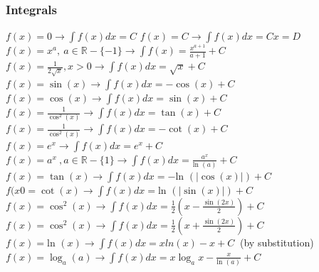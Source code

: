 \documentclass[12pt]{article}
\def\ln{\text{ln\ }} %
\begin{document}
\begin{flushleft}
	\subsubsection{Integrals}
	
	\textbullet \quad $\displaystyle f(x) = 0 \rightarrow \int f(x) dx = C $ \linebreak 
	\textbullet \quad $\displaystyle f(x) = C \rightarrow \int f(x) dx = Cx = D $ \linebreak 
	\textbullet \quad $\displaystyle f(x) = x^a, \ a\in \mathbb{R} - \{-1\} \rightarrow \int f(x) = \frac{x^{a+1}}{a+1} + C $ \linebreak 
	\textbullet \quad $\displaystyle f(x) = \frac{1}{2\sqrt{x}}, x > 0 \rightarrow \int f(x) dx = \sqrt{x} + C$ \linebreak 
	\textbullet \quad $\displaystyle f(x) = \sin (x) \rightarrow \int f(x) dx = -\cos (x) + C $ \linebreak 
	\textbullet \quad $\displaystyle f(x) = \cos (x) \rightarrow \int f(x) dx = \sin (x) + C $ \linebreak 
	\textbullet \quad $\displaystyle f(x) = \frac{1}{\cos ^2(x)} \rightarrow \int f(x) dx = \tan (x) + C$ \linebreak 
	\textbullet \quad $\displaystyle f(x) = \frac{1}{\cos ^2(x)} \rightarrow \int f(x) dx = -\cot (x) + C$ \linebreak 
	\textbullet \quad $\displaystyle f(x) = e^x \rightarrow \int f(x) dx = e^x + C$ \linebreak 
	\textbullet \quad $\displaystyle f(x) = a^x\ , a \in \mathbb{R} - \{ 1 \} \rightarrow \int f(x) dx = \frac{a^x}{\ln (a)} + C $ \linebreak 
	\textbullet \quad $\displaystyle f(x) = \tan (x) \rightarrow \int f(x) dx = -\ln (|\cos (x)|) + C$ \linebreak 
	\textbullet \quad $\displaystyle f(x0 = \cot (x) \rightarrow \int f(x) dx = \ln (|\sin (x)|) + C $ \linebreak 
	\textbullet \quad $\displaystyle f(x) = \cos ^2(x) \rightarrow \int f(x) dx = \frac{1}{2} \left( x - \frac{\sin (2x)}{2} \right) + C $ \linebreak 
	\textbullet \quad $\displaystyle f(x) = \cos ^2(x) \rightarrow \int f(x) dx = \frac{1}{2} \left( x + \frac{\sin (2x)}{2} \right) + C $ \linebreak 
	\textbullet \quad $\displaystyle f(x) = \ln(x) \rightarrow \int f(x) dx = xln(x) -x + C \ $ (by substitution) \linebreak 
	\textbullet \quad $\displaystyle f(x) = \log_a (a) \rightarrow \int f(x) dx = x\log_a x - \frac{x}{\ln(a)} + C$ \linebreak 

\end{flushleft}
\end{document}
